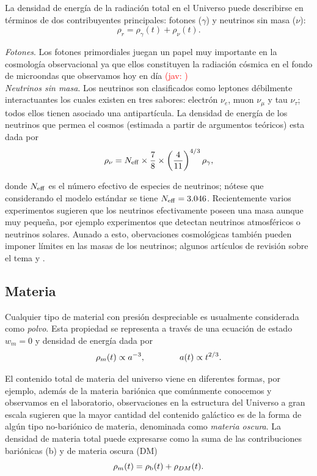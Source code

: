 \documentclass[10.5pt,prb,
               showpacs,            %
               preprintnumbers,     %
               aps,                 %
               prl,          	    %
               letterpaper,             %
               superscriptaddress,      %
               nofootinbib,         %
               tightenlines,        %
               floats,floatfix      %
               ,usenatbib]{revtex4-1}%
\def\beq{\begin{equation}}
\def\eeq{\end{equation}}
\newcommand{\jav}[1]{\textcolor{red}{(jav: #1)}}
\begin{document}
\noindent
La densidad de energ\'ia de la radiaci\'on total en el Universo puede describirse en t\'erminos
de dos contribuyentes principales: fotones ($\gamma$) y neutrinos sin masa ($\nu$):
%
	\beq
		\rho_r = \rho_\gamma(t) + \rho_\nu(t).
	\eeq

\textit{Fotones}. Los fotones primordiales juegan un papel muy importante en la cosmolog\'ia 
observacional  ya que ellos constituyen la radiaci\'on c\'osmica en el fondo de microondas que observamos
hoy en d\'ia \jav{ \cite{alguna cita}}
\\

\textit{Neutrinos sin masa}. Los neutrinos son clasificados como leptones d\'ebilmente interactuantes los cuales existen
en tres sabores: electr\'on $\nu_e$, muon $\nu_\mu$ y tau $\nu_\tau$; todos ellos tienen asociado una antipart\'icula. 
La densidad de energ\'ia  de los neutrinos que permea el cosmos (estimada a partir de argumentos te\'oricos) esta
dada por 
%
	\beq \label{eq:nu}
		\rho_\nu = N_{\rm eff} \times \frac{7}{8}\times \left(\frac{4}{11} \right)^{4/3}\rho_\gamma,
	\eeq

\noindent
donde $N_{\rm eff}$ es el n\'umero efectivo de especies de neutrinos; n\'otese que considerando el modelo est\'andar se tiene $N_{\rm eff}=3.046$.
Recientemente varios experimentos sugieren que los neutrinos efectivamente poseen 
una masa aunque muy peque\~na, por ejemplo experimentos que detectan neutrinos atmosf\'ericos o neutrinos solares.
Aunado a esto, obervaciones cosmol\'ogicas tambi\'en pueden imponer l\'imites en las masas de los neutrinos; algunos art\'iculos
de revisi\'on sobre el tema \cite{neutrino} y \cite{neutrinomass1}.


\subsection*{Materia}

Cualquier tipo de material con presi\'on despreciable es usualmente considerada como \textit{polvo}. 
Esta propiedad se representa a trav\'es de una ecuaci\'on de estado $w_m=0$ y densidad de energ\'ia dada por
%
	\beq
		\rho_m(t) \propto a^{-3}, \qquad {\rm} \qquad a(t)\propto t^{2/3}.
	\eeq
	
\noindent
El contenido total de materia del universo viene en diferentes formas,  por ejemplo, adem\'as de la materia bari\'onica que 
com\'unmente conocemos y observamos en el laboratorio, observaciones en la estructura del Universo a gran escala 
sugieren que la mayor cantidad del contenido gal\'actico es de la forma de alg\'un tipo no-bari\'onico de materia, denominada 
como \textit{materia oscura}. 
La densidad de materia total puede expresarse como la suma de las contribuciones bari\'onicas (b)
y de materia oscura (DM)
%
	\beq
		\rho_m(t) = \rho_{\rm b}(t) + \rho_{DM}(t).
	\eeq
\end{document}

